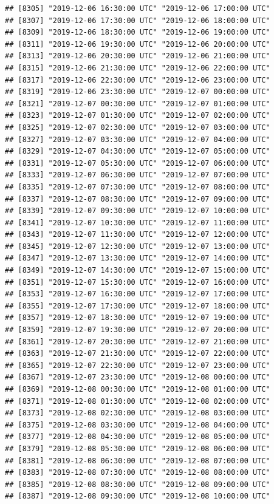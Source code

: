 \documentclass{article}\usepackage[]{graphicx}\usepackage[]{color}
\makeatletter
\newenvironment{kframe}{%
 \def\at@end@of@kframe{}%
 \ifinner\ifhmode%
  \def\at@end@of@kframe{\end{minipage}}%
  \begin{minipage}{\columnwidth}%
 \fi\fi%
 \def\FrameCommand##1{\hskip\@totalleftmargin \hskip-\fboxsep
 \colorbox{shadecolor}{##1}\hskip-\fboxsep
     \hskip-\linewidth \hskip-\@totalleftmargin \hskip\columnwidth}%
 \MakeFramed {\advance\hsize-\width
   \@totalleftmargin\z@ \linewidth\hsize
   \@setminipage}}%
 {\par\unskip\endMakeFramed%
 \at@end@of@kframe}
\newenvironment{knitrout}{}{} %
\makeatother
\begin{document}
\begin{knitrout}
\begin{kframe}
\begin{verbatim}
## [8305] "2019-12-06 16:30:00 UTC" "2019-12-06 17:00:00 UTC"
## [8307] "2019-12-06 17:30:00 UTC" "2019-12-06 18:00:00 UTC"
## [8309] "2019-12-06 18:30:00 UTC" "2019-12-06 19:00:00 UTC"
## [8311] "2019-12-06 19:30:00 UTC" "2019-12-06 20:00:00 UTC"
## [8313] "2019-12-06 20:30:00 UTC" "2019-12-06 21:00:00 UTC"
## [8315] "2019-12-06 21:30:00 UTC" "2019-12-06 22:00:00 UTC"
## [8317] "2019-12-06 22:30:00 UTC" "2019-12-06 23:00:00 UTC"
## [8319] "2019-12-06 23:30:00 UTC" "2019-12-07 00:00:00 UTC"
## [8321] "2019-12-07 00:30:00 UTC" "2019-12-07 01:00:00 UTC"
## [8323] "2019-12-07 01:30:00 UTC" "2019-12-07 02:00:00 UTC"
## [8325] "2019-12-07 02:30:00 UTC" "2019-12-07 03:00:00 UTC"
## [8327] "2019-12-07 03:30:00 UTC" "2019-12-07 04:00:00 UTC"
## [8329] "2019-12-07 04:30:00 UTC" "2019-12-07 05:00:00 UTC"
## [8331] "2019-12-07 05:30:00 UTC" "2019-12-07 06:00:00 UTC"
## [8333] "2019-12-07 06:30:00 UTC" "2019-12-07 07:00:00 UTC"
## [8335] "2019-12-07 07:30:00 UTC" "2019-12-07 08:00:00 UTC"
## [8337] "2019-12-07 08:30:00 UTC" "2019-12-07 09:00:00 UTC"
## [8339] "2019-12-07 09:30:00 UTC" "2019-12-07 10:00:00 UTC"
## [8341] "2019-12-07 10:30:00 UTC" "2019-12-07 11:00:00 UTC"
## [8343] "2019-12-07 11:30:00 UTC" "2019-12-07 12:00:00 UTC"
## [8345] "2019-12-07 12:30:00 UTC" "2019-12-07 13:00:00 UTC"
## [8347] "2019-12-07 13:30:00 UTC" "2019-12-07 14:00:00 UTC"
## [8349] "2019-12-07 14:30:00 UTC" "2019-12-07 15:00:00 UTC"
## [8351] "2019-12-07 15:30:00 UTC" "2019-12-07 16:00:00 UTC"
## [8353] "2019-12-07 16:30:00 UTC" "2019-12-07 17:00:00 UTC"
## [8355] "2019-12-07 17:30:00 UTC" "2019-12-07 18:00:00 UTC"
## [8357] "2019-12-07 18:30:00 UTC" "2019-12-07 19:00:00 UTC"
## [8359] "2019-12-07 19:30:00 UTC" "2019-12-07 20:00:00 UTC"
## [8361] "2019-12-07 20:30:00 UTC" "2019-12-07 21:00:00 UTC"
## [8363] "2019-12-07 21:30:00 UTC" "2019-12-07 22:00:00 UTC"
## [8365] "2019-12-07 22:30:00 UTC" "2019-12-07 23:00:00 UTC"
## [8367] "2019-12-07 23:30:00 UTC" "2019-12-08 00:00:00 UTC"
## [8369] "2019-12-08 00:30:00 UTC" "2019-12-08 01:00:00 UTC"
## [8371] "2019-12-08 01:30:00 UTC" "2019-12-08 02:00:00 UTC"
## [8373] "2019-12-08 02:30:00 UTC" "2019-12-08 03:00:00 UTC"
## [8375] "2019-12-08 03:30:00 UTC" "2019-12-08 04:00:00 UTC"
## [8377] "2019-12-08 04:30:00 UTC" "2019-12-08 05:00:00 UTC"
## [8379] "2019-12-08 05:30:00 UTC" "2019-12-08 06:00:00 UTC"
## [8381] "2019-12-08 06:30:00 UTC" "2019-12-08 07:00:00 UTC"
## [8383] "2019-12-08 07:30:00 UTC" "2019-12-08 08:00:00 UTC"
## [8385] "2019-12-08 08:30:00 UTC" "2019-12-08 09:00:00 UTC"
## [8387] "2019-12-08 09:30:00 UTC" "2019-12-08 10:00:00 UTC"

\end{verbatim}
\end{kframe}
\end{knitrout}
\end{document}
